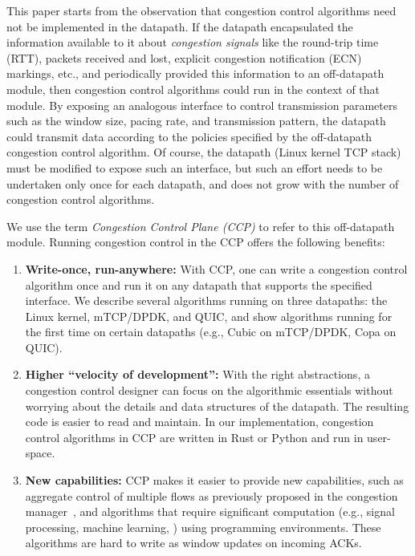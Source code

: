 This paper starts from the observation that congestion control algorithms need not be implemented in the datapath. If the datapath encapsulated the information available to it about {\em congestion signals} like the round-trip time (RTT), packets received and lost, explicit congestion notification (ECN) markings, etc., and periodically provided this information to an off-datapath module, then congestion control algorithms could run in the context of that module. By exposing an analogous interface to control transmission parameters such as the window size, pacing rate, and transmission pattern, the datapath could transmit data according to the policies specified by the off-datapath congestion control algorithm. Of course, the datapath (\eg Linux kernel TCP stack) must be modified to expose
such an interface, but such an effort needs to be undertaken only once for each datapath, and does not grow with the number of congestion control algorithms.

We use the term {\em Congestion Control Plane (CCP)} to refer to this off-datapath module. Running congestion control in the CCP offers the following benefits:
\begin{enumerate}
    \item {\bf Write-once, run-anywhere:} With CCP, one can write a congestion control algorithm once and run it on any datapath that supports the specified interface. 
    We describe several algorithms running on three datapaths: the Linux kernel, mTCP/DPDK, and QUIC, and show algorithms running for the first time on certain datapaths (e.g., Cubic on mTCP/DPDK, Copa on QUIC).
    \item {\bf Higher ``velocity of development'':} With the right abstractions,
      a congestion control designer can focus on the algorithmic essentials
      without worrying about the details and data structures of the
      datapath. The resulting code is easier to read and maintain. In our implementation, congestion control algorithms in CCP are written in Rust or Python and run in user-space. 

    \item {\bf New capabilities:} CCP makes it easier to provide new
      capabilities, such as aggregate control of multiple flows as previously
      proposed in the congestion manager~\cite{cm}, and algorithms that require significant computation (e.g., signal processing, machine learning, \etc) using \userspace programming environments. These algorithms are hard to write as window updates on incoming ACKs.
\end{enumerate}

